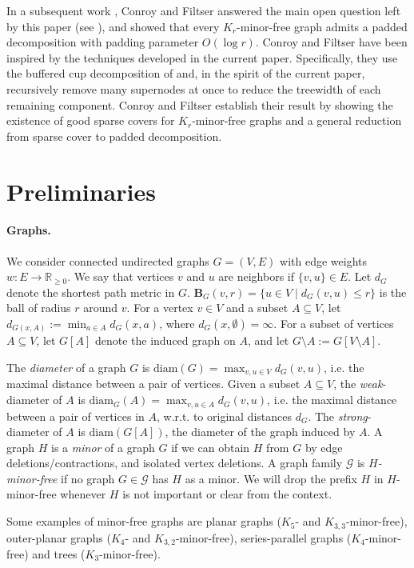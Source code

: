 \documentclass{theoretics}
\newcommand{\R}{\mathbb{R}}
\newcommand{\diam}{\mathrm{diam}}
\def\ball{\mathbf{B}}
\begin{document}
In a subsequent work \cite{CF25}, Conroy and Filtser answered the main open question left by this paper (see ), and showed that every $K_{r}$-minor-free graph admits a padded decomposition with padding parameter $O(\log r)$. Conroy and Filtser have been inspired by the techniques developed in the current paper. Specifically, they use the buffered cup decomposition of \cite{CCL+24} and, in the spirit of the current paper, recursively remove many supernodes at once to reduce the treewidth of each remaining component. Conroy and Filtser establish their result by showing the existence of good sparse covers for $K_{r}$-minor-free graphs and a general reduction from sparse cover to padded decomposition.

\section{Preliminaries}
\paragraph*{Graphs.}
We consider connected undirected graphs $G=(V,E)$ with edge weights $w: E \to \R_{\ge 0}$. We say that vertices $v$ and $u$ are neighbors if $\{v,u\}\in E$. Let $d_{G}$ denote the shortest path metric in $G$. $\ball_G(v,r)=\{u\in V\mid d_G(v,u)\le r\}$ is the ball of radius $r$ around $v$. For a vertex $v\in V$ and a subset $A\subseteq V$, let $d_{G(x,A)}:=\min_{a\in A}d_G(x,a)$, where $d_{G}(x,\emptyset)= \infty$. For a subset of vertices $A\subseteq V$, let $G[A]$ denote the induced graph on $A$, and let $G\setminus A := G[V\setminus A]$.

The \emph{diameter} of a graph $G$ is $\diam(G)=\max_{v,u\in V}d_G(v,u)$, i.e. the maximal distance between a pair of vertices.
Given a subset $A\subseteq V$, the \emph{weak}-diameter of $A$ is $\diam_G(A)=\max_{v,u\in A}d_G(v,u)$, i.e. the maximal distance between a pair of vertices in $A$, w.r.t. to original distances $d_G$. The \emph{strong}-diameter of $A$ is $\diam(G[A])$, the diameter of the graph induced by $A$. 
A graph $H$ is a \emph{minor} of a graph $G$ if we can obtain $H$ from
$G$ by edge deletions/contractions, and isolated vertex deletions.  A graph
family $\mathcal{G}$ is \emph{$H$-minor-free} if no graph
$G\in\mathcal{G}$ has $H$ as a minor. We will drop the prefix $H$ in $H$-minor-free whenever $H$ is not important or clear from the context. 

Some examples of minor-free graphs are planar graphs ($K_5$- and $K_{3,3}$-minor-free), outer-planar graphs ($K_4$- and $K_{3,2}$-minor-free), series-parallel graphs ($K_4$-minor-free) and trees ($K_3$-minor-free).
\end{document}
